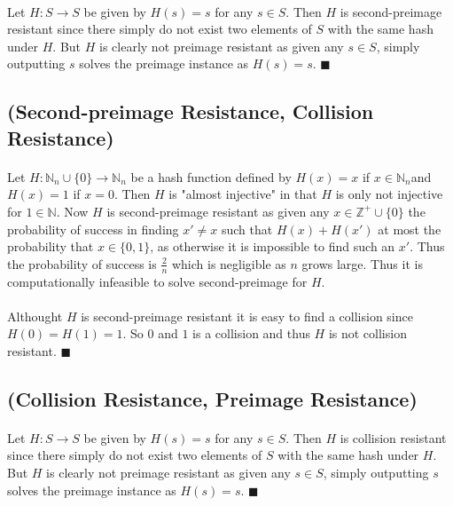 \documentclass[letterpaper,12pt,oneside,onecolumn]{report}
\begin{document}
\paragraph{}
Let $H: S \rightarrow S$ be given by $H(s) = s$ for any $s \in S$. Then $H$ is second-preimage resistant since there simply do not exist two elements of $S$ with the same hash under $H$. But $H$ is clearly not preimage resistant as given any $s \in S$, simply outputting $s$ solves the preimage instance as $H(s) = s$. $\blacksquare$
\subsection*{(Second-preimage Resistance, Collision Resistance)}
\paragraph{}
Let $H: \mathbb{N}_n \cup \{0\} \rightarrow \mathbb{N}_n$ be a hash function defined by $H(x) = x$ if $x \in \mathbb{N}_n$and $H(x) = 1$ if $x = 0$. Then $H$ is "almost injective" in that $H$ is only not injective for $1 \in \mathbb{N}$. Now $H$ is second-preimage resistant as given any $x \in \mathbb{Z}^+ \cup \{0\}$ the probability of success in finding $x' \neq x$ such that $H(x) + H(x')$ at most the probability that $x\in \{0,1\}$, as otherwise it is impossible to find such an $x'$. Thus the probability of success is $\frac{2}{n}$ which is negligible as $n$ grows large. Thus it is computationally infeasible to solve second-preimage for $H$.
\paragraph{}
Althought $H$ is second-preimage resistant it is easy to find a collision since $H(0) = H(1) = 1$. So $0$ and $1$ is a collision and thus $H$ is not collision resistant. $\blacksquare$
\subsection*{(Collision Resistance, Preimage Resistance)}
\paragraph{}
Let $H: S \rightarrow S$ be given by $H(s) = s$ for any $s \in S$. Then $H$ is collision resistant since there simply do not exist two elements of $S$ with the same hash under $H$. But $H$ is clearly not preimage resistant as given any $s \in S$, simply outputting $s$ solves the preimage instance as $H(s) = s$. $\blacksquare$
\end{document}
